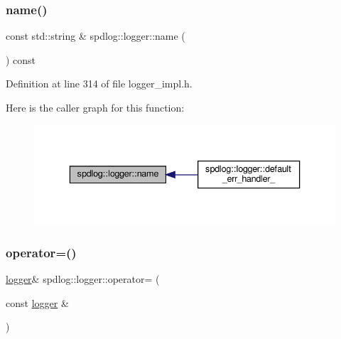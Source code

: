 \mbox{\label{classspdlog_1_1logger_ac7c6ed0f30ace90402254dc2d3ef1453}} 
\subsubsection{\texorpdfstring{name()}{name()}}
{\footnotesize\ttfamily const std\+::string \& spdlog\+::logger\+::name (\begin{DoxyParamCaption}{ }\end{DoxyParamCaption}) const\hspace{0.3cm}{\ttfamily [inline]}}



Definition at line 314 of file logger\+\_\+impl.\+h.

Here is the caller graph for this function\+:
\nopagebreak
\begin{figure}[H]
\begin{center}
\leavevmode
\includegraphics[width=336pt]{classspdlog_1_1logger_ac7c6ed0f30ace90402254dc2d3ef1453_icgraph}
\end{center}
\end{figure}
\mbox{\label{classspdlog_1_1logger_afd373cd857f49de170d9a23f1dd34bc0}} 
\subsubsection{\texorpdfstring{operator=()}{operator=()}}
{\footnotesize\ttfamily \hyperlink{classspdlog_1_1logger}{logger}\& spdlog\+::logger\+::operator= (\begin{DoxyParamCaption}\item[{const \hyperlink{classspdlog_1_1logger}{logger} \&}]{ }\end{DoxyParamCaption})\hspace{0.3cm}{\ttfamily [delete]}}

